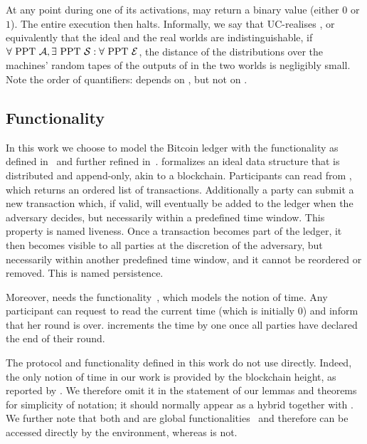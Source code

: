   At any point during one of its activations, \environment may return a binary
  value (either $0$ or $1$). The entire execution then halts. Informally, we say that \prot
  UC-realises \func, or equivalently that the ideal and the real worlds are
  indistinguishable, if $\forall \text{ PPT } \mathcal{A}, \exists \text{ PPT }
  \mathcal{S}: \forall \text{ PPT } \mathcal{E}$, the distance of the
  distributions over the machines' random tapes of the outputs of \environment
  in the two worlds is negligibly small. Note the order of quantifiers:
  \simulator depends on \adversary, but not on \environment.

  \subsection{\ledger Functionality}
  In this work we choose to model the Bitcoin ledger with the \ledger
  functionality as defined in~\cite{BMTZ17} and further refined
  in~\cite{genesis}. \ledger formalizes an ideal data structure that is
  distributed and append-only, akin to a blockchain. Participants can read from
  \ledger, which returns an ordered list of transactions. Additionally a party
  can submit a new transaction which, if valid, will eventually be added to the
  ledger when the adversary decides, but necessarily within a predefined time
  window. This property is named liveness. Once a transaction becomes part of
  the ledger, it then becomes visible to all parties at the discretion of the
  adversary, but necessarily within another predefined time window, and it
  cannot be reordered or removed. This is named persistence.

  Moreover, \ledger needs the \gFclock
  functionality~\cite{DBLP:conf/tcc/KatzMTZ13}, which models the notion of time.
  Any \gFclock participant can request to read the current time (which is
  initially 0) and inform \gFclock that her round is over. \gFclock increments the
  time by one once all parties have declared the end of their round.

  The protocol and functionality defined in this work do not use \gFclock
  directly. Indeed, the only notion of time in our work is provided by the
  blockchain height, as reported by \ledger. We therefore omit it in the
  statement of our lemmas and theorems for simplicity of notation; it should
  normally appear as a hybrid together with \ledger. We further note that both
  \ledger and \gFclock are global functionalities~\cite{globaluc} and therefore
  can be accessed directly by the environment, whereas \fchan is not.
